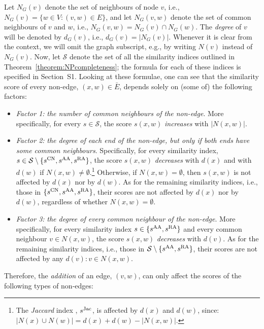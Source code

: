 \documentclass[twocolumn]{article}
\newcommand{\ER}{\bar{E}}
\newcommand{\sCN}{s^{\text{\normalfont CN}}}
\newcommand{\sJac}{s^{\text{\normalfont Jac}}}
\newcommand{\sAA}{s^{\text{\normalfont AA}}}
\newcommand{\sRA}{s^{\text{\normalfont RA}}}
\begin{document}
Let $N_G(v)$ denote the set of neighbours of node $v$, i.e., $N_G(v) = \{w \in V : (v,w) \in E\}$, and let $N_G(v,w)$ denote the set of common neighbours of $v$ and $w$, i.e., $N_G(v,w)= N_G(v) \cap N_G(w)$. The \textit{degree} of $v$ will be denoted by $d_G(v)$, i.e., $d_G(v)=|N_G(v)|$. Whenever it is clear from the context, we will omit the graph subscript, e.g., by writing $N(v)$ instead of $N_G(v)$.
Now, let $\mathcal{S}$ denote the set of all the similarity indices outlined in Theorem~\ref{theorem:NPcompleteness}; the formula for each of these indices is specified in Section~S1. Looking at these formulae, one can see that the similarity score of every non-edge, $(x,w)\in\ER$, depends solely on (some of) the following factors:

\begin{itemize}
\item \textit{Factor 1:} \textit{the number of common neighbours of the non-edge}. More specifically, for every $s\in\mathcal{S}$, the score $s(x,w)$ \emph{increases} with $|N(x,w)|$.

\item \textit{Factor 2:} \textit{the degree of each end of the non-edge, but only if both ends have some common neighbours}. Specifically, for every similarity index, $s\in\mathcal{S}\setminus\{\sCN, \sAA, \sRA\}$, the score $s(x,w)$ \emph{decreases} with $d(x)$ and with $d(w)$ if $N(x,w)\neq \emptyset$.\footnote{\footnotesize The \emph{Jaccard} index \cite{jaccard1901etude}, $\sJac$, is affected by $d(x)$ and $d(w)$, since: $|N(x) \cup N(w)| = d(x)+d(w)-|N(x,w)|$.} Otherwise, if $N(x,w)=\emptyset$, then $s(x,w)$ is not affected by $d(x)$ nor by $d(w)$. As for the remaining similarity indices, i.e., those in $\{\sCN, \sAA, \sRA\}$, their scores are not affected by $d(x)$ nor by $d(w)$, regardless of whether $N(x,w)=\emptyset$.

\item \textit{Factor 3:} \textit{the degree of every common neighbour of the non-edge}. More specifically, for every similarity index $s\in\{\sAA,\sRA\}$ and every common neighbour $v\in N(x,w)$, the score $s(x,w)$ \emph{decreases} with $d(v)$. As for the remaining similarity indices, i.e., those in $\mathcal{S}\setminus\{\sAA,\sRA\}$, their scores are not affected by any $d(v):v\in N(x,w)$.
\end{itemize}

Therefore, the \emph{addition} of an edge, $(v,w)$, can only affect the scores of the following types of non-edges:
\end{document}
